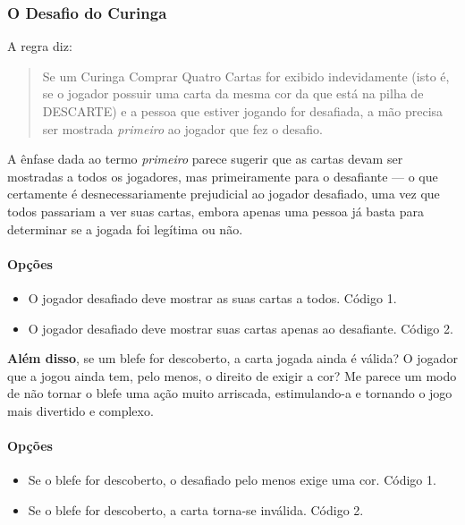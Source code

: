 \subsubsection{O Desafio do Curinga}

A regra diz:

\begin{quote}
Se um Curinga Comprar Quatro Cartas for exibido indevidamente (isto é, se o jogador possuir uma carta da mesma cor da que está na pilha de DESCARTE) e a pessoa que estiver jogando for desafiada, a mão precisa ser mostrada \textit{primeiro} ao jogador que fez o desafio.
\end{quote}

A ênfase dada ao termo \textit{primeiro} parece sugerir que as cartas devam ser mostradas a todos os jogadores, mas primeiramente para o desafiante --- o que certamente é desnecessariamente prejudicial ao jogador desafiado, uma vez que todos passariam a ver suas cartas, embora apenas uma pessoa já basta para determinar se a jogada foi legítima ou não.

\paragraph{Opções}

\begin{itemize}
\item{O jogador desafiado deve mostrar as suas cartas a todos. Código 1.}
\item{O jogador desafiado deve mostrar suas cartas apenas ao desafiante. Código 2.}
\end{itemize} 

\textbf{Além disso}, se um blefe for descoberto, a carta jogada ainda é válida? O jogador que a jogou ainda tem, pelo menos, o direito de exigir a cor? Me parece um modo de não tornar o blefe uma ação muito arriscada, estimulando-a e tornando o jogo mais divertido e complexo.

\paragraph{Opções}

\begin{itemize}
\item{Se o blefe for descoberto, o desafiado pelo menos exige uma cor. Código 1.}
\item{Se o blefe for descoberto, a carta torna-se inválida. Código 2.}
\end{itemize}


